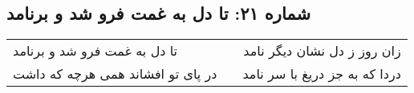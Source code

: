 \begin{center}
\section*{شماره ۲۱: تا دل به غمت فرو شد و برنامد}
\label{sec:021}
\begin{longtable}{l p{0.5cm} r}
تا دل به غمت فرو شد و برنامد
&&
زان روز ز دل نشان دیگر نامد
\\
در پای تو افشاند همی هرچه که داشت
&&
دردا که به جز دریغ با سر نامد
\\
\end{longtable}
\end{center}
